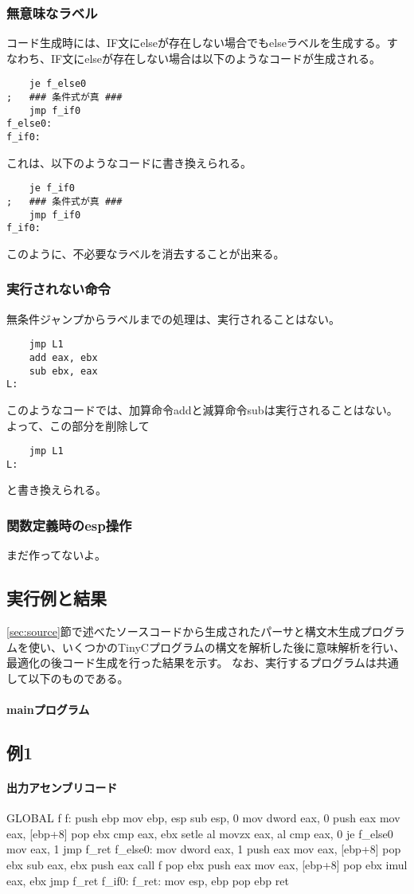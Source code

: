 \documentclass[titlepage, a4paper,12pt]{jarticle}
\begin{document}
\subsubsection{無意味なラベル}
コード生成時には、IF文にelseが存在しない場合でもelseラベルを生成する。すなわち、IF文にelseが存在しない場合は以下のようなコードが生成される。
\begin{verbatim}
    je f_else0
;   ### 条件式が真 ###
    jmp f_if0
f_else0:
f_if0:
\end{verbatim}
これは、以下のようなコードに書き換えられる。
\begin{verbatim}
    je f_if0
;   ### 条件式が真 ###
    jmp f_if0
f_if0:
\end{verbatim}
このように、不必要なラベルを消去することが出来る。
\subsubsection{実行されない命令}
無条件ジャンプからラベルまでの処理は、実行されることはない。
\begin{verbatim}
    jmp L1
    add eax, ebx
    sub ebx, eax
L:
\end{verbatim}
このようなコードでは、加算命令addと減算命令subは実行されることはない。よって、この部分を削除して
\begin{verbatim}
    jmp L1
L:
\end{verbatim}
と書き換えられる。
\subsubsection{関数定義時のesp操作}
まだ作ってないよ。
\subsection{実行例と結果}
\ref{sec:source}節で述べたソースコードから生成されたパーサと構文木生成プログラムを使い、いくつかのTinyCプログラムの構文を解析した後に意味解析を行い、最適化の後コード生成を行った結果を示す。
なお、実行するプログラムは共通して以下のものである。
\paragraph{mainプログラム}

\subsection{例1}

\paragraph{出力アセンブリコード}
\begin{verbatimtab}[4]
	GLOBAL	f
f:
	push	ebp
	mov	ebp, esp
	sub	esp, 0
	mov	dword eax, 0
	push	eax
	mov	eax, [ebp+8]
	pop	ebx
	cmp	eax, ebx
	setle	al
	movzx	eax, al
	cmp	eax, 0
	je	f_else0
	mov	eax, 1
	jmp	f_ret
f_else0:
	mov	dword eax, 1
	push	eax
	mov	eax, [ebp+8]
	pop	ebx
	sub	eax, ebx
	push	eax
	call	f
	pop	ebx
	push	eax
	mov	eax, [ebp+8]
	pop	ebx
	imul	eax, ebx
	jmp	f_ret
f_if0:
f_ret:
	mov	esp, ebp
	pop	ebp
	ret
\end{verbatimtab}
\end{document}
